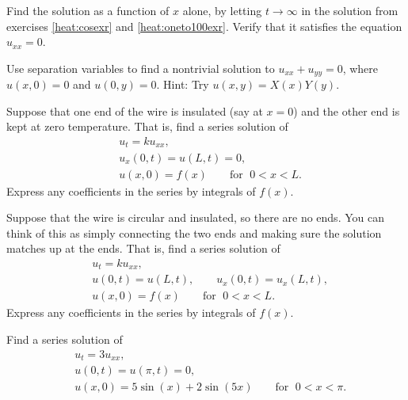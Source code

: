 \begin{exercise}
Find the \emph{} solution as a function
of $x$ alone,
by letting $t \to
\infty$ in the solution from
exercises \ref{heat:cosexr} and \ref{heat:oneto100exr}.
Verify that it satisfies the equation $u_{xx} = 0$.
\end{exercise}

\begin{exercise}
Use separation variables to find a nontrivial
solution to $u_{xx} + u_{yy} = 0$, where $u(x,0) = 0$ and $u(0,y) = 0$.
Hint: Try $u(x,y) = X(x)Y(y)$.
\end{exercise}

\begin{exercise}[challenging]
Suppose that one end of the wire is insulated (say at $x=0$) and
the other end is kept at zero temperature.  That is,
find a series solution of
\begin{align*}
& u_t = k u_{xx} , \\
& u_x(0,t) = u(L,t) = 0 , \\
& u(x,0) = f(x) \qquad \text{for } \; 0 < x < L .
\end{align*}
Express any coefficients in the series by integrals of $f(x)$.
\end{exercise}

\begin{exercise}[challenging]
Suppose that the wire is circular and insulated, so there are no ends. 
You can think of this as simply connecting the two ends and 
making sure the solution matches up at the ends.
That is, find a series solution of
\begin{align*}
& u_t = k u_{xx} , \\
& u(0,t) = u(L,t) , \qquad
u_x(0,t) = u_x(L,t) , \\
& u(x,0) = f(x) \qquad \text{for } \; 0 < x < L .
\end{align*}
Express any coefficients in the series by integrals of $f(x)$.
\end{exercise}

\setcounter{exercise}{100}


\begin{exercise}
Find a series solution of
\begin{align*}
& u_t =  3 u_{xx} , \\
& u(0,t) = u(\pi,t) = 0 , \\
& u(x,0) = 5\sin (x) + 2\sin (5x) \qquad \text{for } \; 0 < x < \pi .
\end{align*}
\end{exercise}

